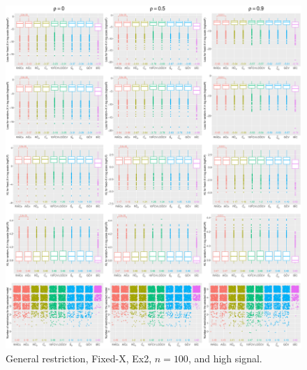 \clearpage
\begin{figure}[!ht]
\centering
\includegraphics[width=\textwidth]{figures/supplement/fixedx/general_restriction/Ex2_n100_hsnr.eps}
\caption{General restriction, Fixed-X, Ex2, $n=100$, and high signal.}
\end{figure}
\clearpage
